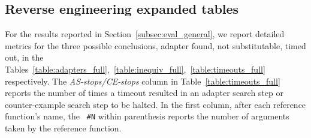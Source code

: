 \subsection{Reverse engineering expanded tables}
\label{sec:all_tables}
For the results reported in Section~\ref{subsec:eval_general}, we report detailed metrics for the three possible conclusions, adapter
found, not substitutable, timed out, in the
Tables~\ref{table:adapters_full},~\ref{table:inequiv_full},~\ref{table:timeouts_full}
respectively.
%
The \textit{AS-stops/CE-stops} column in Table~\ref{table:timeouts_full} reports the number of times a timeout resulted in an adapter search step or counter-example search step to be halted.
%
In the first column, after each reference function\rq s name, the {\tt
\#N} within parenthesis reports the number of arguments taken by the reference function.


